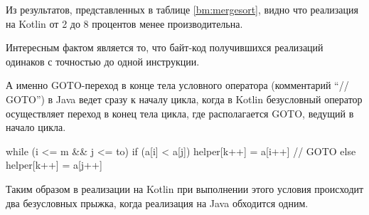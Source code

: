 Из результатов, представленных в таблице \ref{bm:mergesort}, видно что реализация на Kotlin от 2
до 8 процентов менее производительна.

Интересным фактом является то, что байт-код получившихся реализаций одинаков с точностью до одной
инструкции.

А именно GOTO-переход в конце тела условного оператора (комментарий ``// GOTO'') в Java ведет
сразу к началу цикла, когда в Kotlin безусловный оператор осуществляет переход в конец тела цикла,
где располагается GOTO, ведущий в начало цикла.

\begin{pyglist}[language=kotlin]
    while (i <= m && j <= to) {
        if (a[i] < a[j]) {
            helper[k++] = a[i++] // GOTO
        } else {
            helper[k++] = a[j++]
        }
    }
\end{pyglist}

Таким образом в реализации на Kotlin при выполнении этого условия происходит два безусловных
прыжка, когда реализация на Java обходится одним.
